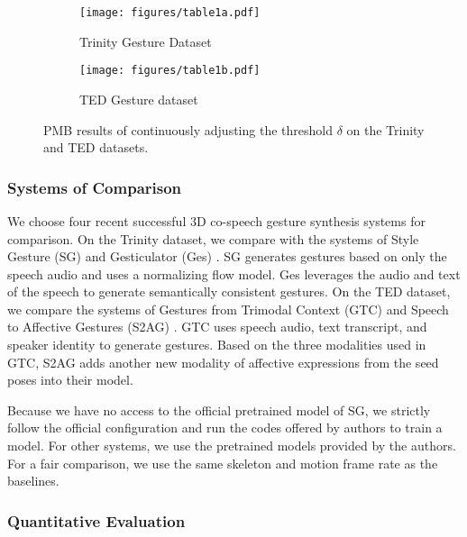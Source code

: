 \documentclass[acmtog,authorversion]{acmart}
\begin{document}
\begin{table*}[t]
\end{table*}

\begin{figure}[t]
    \centering
    \begin{subfigure}[t]{0.47\linewidth}
        \centering
        \texttt{[image: figures/table1a.pdf]}
        \caption{Trinity Gesture Dataset}
        \label{fig:table1a}
    \end{subfigure}
    \hspace{\fill}
    \begin{subfigure}[t]{0.47\linewidth}
        \centering
        \texttt{[image: figures/table1b.pdf]}
        \caption{TED Gesture dataset}
        \label{fig:table1b}
    \end{subfigure}
    \Description{}
    \caption{PMB results of continuously adjusting the threshold $\delta$ on the Trinity and TED datasets.}
    \label{fig:table1}
\end{figure}

\subsubsection{Systems of Comparison}
We choose four recent successful 3D co-speech gesture synthesis systems for comparison. On the Trinity dataset, we compare with the systems of Style Gesture (SG) \cite{alexanderson2020style} and Gesticulator (Ges) \cite{kucherenko2020gesticulator}. SG generates gestures based on only the speech audio and uses a normalizing flow model. Ges leverages the audio and text of the speech to generate semantically consistent gestures. On the TED dataset, we compare the systems of Gestures from Trimodal Context (GTC) \cite{yoon2020speech} and Speech to Affective Gestures (S2AG) \cite{bhattacharya2021speech2affectivegestures}. GTC uses speech audio, text transcript, and speaker identity to generate gestures. Based on the three modalities used in GTC, S2AG adds another new modality of affective expressions from the seed poses into their model.

Because we have no access to the official pretrained model of SG, we strictly follow the official configuration and run the codes offered by authors to train a model. For other systems, we use the pretrained models provided by the authors. For a fair comparison, we use the same skeleton and motion frame rate as the baselines.

\subsubsection{Quantitative Evaluation}
\end{document}
